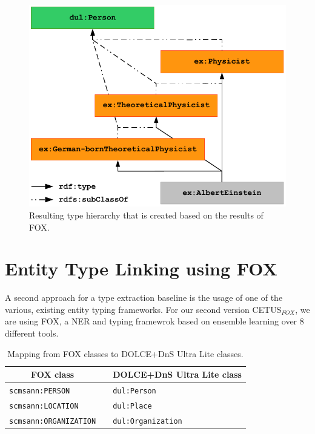 \begin{figure}[htb!]
\centering
\includegraphics[scale=0.75]{part_02/unstructured_annotation/fig/localFOXHierarchy.pdf}
\caption{Resulting type hierarchy that is created based on the results of FOX.}
\label{fig:localFOXHierarchy}
\end{figure}
\section{Entity Type Linking using FOX}
\label{sec:typeLinking}
A second approach for a type extraction baseline is the usage of one of the various, existing entity typing frameworks.
For our second version CETUS$_{FOX}$, we are using FOX, a \ac{NER} and typing framewrok based on ensemble learning over 8 different tools.

\begin{table}
\centering
\begin{tabular}{lp{5mm}l}
\toprule
 \multicolumn{1}{c}{FOX class} && DOLCE+DnS Ultra Lite class \\
\midrule
 \texttt{scmsann:PERSON} && \texttt{dul:Person} \\
 \texttt{scmsann:LOCATION} && \texttt{dul:Place} \\
 \texttt{scmsann:ORGANIZATION} && \texttt{dul:Organization} \\
\bottomrule
\end{tabular}
\caption{Mapping from FOX classes to DOLCE+DnS Ultra Lite classes.}
\label{tab:foxclassmatching}
\end{table}

